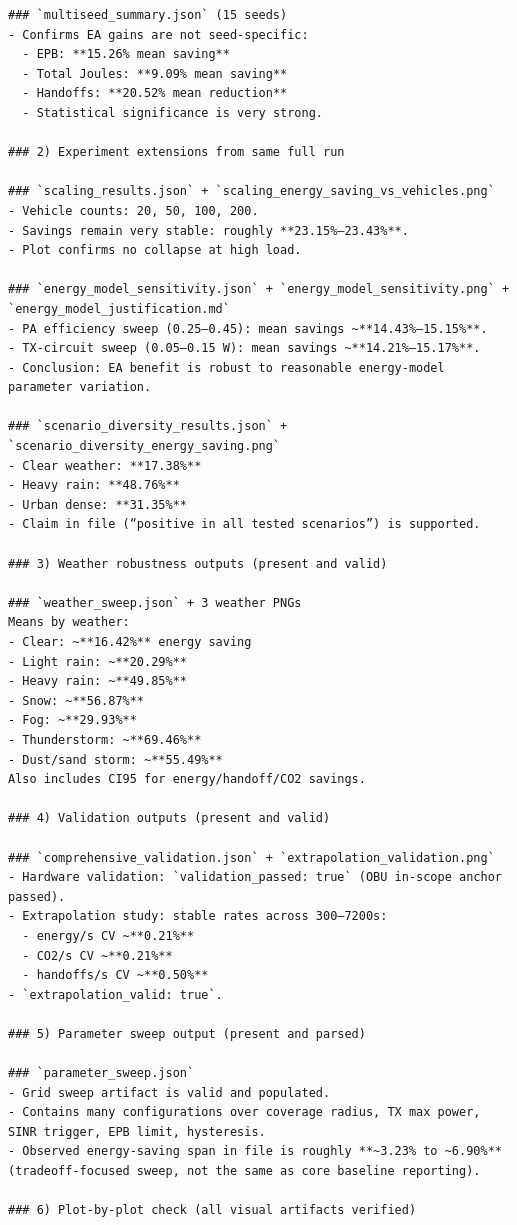 \documentclass[11pt,a4paper]{article}
\newenvironment{assistantbox}
  {\begin{tcolorbox}[
    breakable,
    colback=AsstBG,
    colframe=AsstBorder,
    title=Project Overview Extract,
    fonttitle=\bfseries\small\color{white},
    coltitle=white,
    colbacktitle=AsstBorder,
    boxrule=0.5pt,
    arc=1.2mm,
    left=1.4mm,right=1.4mm,top=0.8mm,bottom=0.8mm,
    boxsep=0.6mm,
    before skip=0pt,
    after skip=0pt
  ]}
  {\end{tcolorbox}}
\begin{document}
\begin{assistantbox}
\begin{Verbatim}[breaklines=true,breakanywhere=true]
### `multiseed_summary.json` (15 seeds)
- Confirms EA gains are not seed-specific:
  - EPB: **15.26% mean saving**
  - Total Joules: **9.09% mean saving**
  - Handoffs: **20.52% mean reduction**
  - Statistical significance is very strong.

### 2) Experiment extensions from same full run

### `scaling_results.json` + `scaling_energy_saving_vs_vehicles.png`
- Vehicle counts: 20, 50, 100, 200.
- Savings remain very stable: roughly **23.15%–23.43%**.
- Plot confirms no collapse at high load.

### `energy_model_sensitivity.json` + `energy_model_sensitivity.png` + `energy_model_justification.md`
- PA efficiency sweep (0.25–0.45): mean savings ~**14.43%–15.15%**.
- TX-circuit sweep (0.05–0.15 W): mean savings ~**14.21%–15.17%**.
- Conclusion: EA benefit is robust to reasonable energy-model parameter variation.

### `scenario_diversity_results.json` + `scenario_diversity_energy_saving.png`
- Clear weather: **17.38%**
- Heavy rain: **48.76%**
- Urban dense: **31.35%**
- Claim in file (“positive in all tested scenarios”) is supported.

### 3) Weather robustness outputs (present and valid)

### `weather_sweep.json` + 3 weather PNGs
Means by weather:
- Clear: ~**16.42%** energy saving
- Light rain: ~**20.29%**
- Heavy rain: ~**49.85%**
- Snow: ~**56.87%**
- Fog: ~**29.93%**
- Thunderstorm: ~**69.46%**
- Dust/sand storm: ~**55.49%**
Also includes CI95 for energy/handoff/CO2 savings.

### 4) Validation outputs (present and valid)

### `comprehensive_validation.json` + `extrapolation_validation.png`
- Hardware validation: `validation_passed: true` (OBU in-scope anchor passed).
- Extrapolation study: stable rates across 300–7200s:
  - energy/s CV ~**0.21%**
  - CO2/s CV ~**0.21%**
  - handoffs/s CV ~**0.50%**
- `extrapolation_valid: true`.

### 5) Parameter sweep output (present and parsed)

### `parameter_sweep.json`
- Grid sweep artifact is valid and populated.
- Contains many configurations over coverage radius, TX max power, SINR trigger, EPB limit, hysteresis.
- Observed energy-saving span in file is roughly **~3.23% to ~6.90%** (tradeoff-focused sweep, not the same as core baseline reporting).

### 6) Plot-by-plot check (all visual artifacts verified)


\end{Verbatim}
\end{assistantbox}
\end{document}
